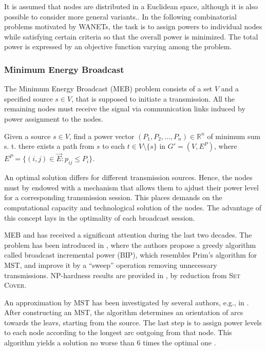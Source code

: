 It is assumed that nodes are distributed in a Euclidean space, although it is also possible to consider more general variants..
In the following combinatorial problems motivated by WANETs, the task is to assign powers to individual nodes while satisfying certain criteria so that the overall power is minimized.
The total power is expressed by an objective function varying among the problem.

\subsubsection{Minimum Energy Broadcast}

The Minimum Energy Broadcast (MEB) problem consists of a set $V$ and a specified source $s\in V$, that is supposed to initiate a transmission.
All the remaining nodes must receive the signal via communication links induced by power assignment to the nodes.
\begin{problem}
Given a source $s\in V$, find a power vector $(P_1,P_2,\dots,P_n)\in\mathbb{R}^n$ of minimum sum s. t. 
there exists a path from $s$ to each $t\in V\setminus\{s\}$ in $G'=(V,E^P)$, where $E^P=\{(i,j)\in \vec{E}: p_{ij}\leq P_i\}$.
\end{problem}
An optimal solution differs for different transmission sources.
Hence, the nodes must by endowed with a mechanism that allows them to ajdust their power level for a corresponding transmission session.
This places demands on the computational capacity and technological solution of the nodes.
The advantage of this concept lays in the optimality of each broadcast session.

MEB  and has received a significant attention during the last two decades.
The problem has been introduced in \cite{wieselthier00}, where the authors propose a greedy algorithm called broadcast incremental power (BIP), which resembles Prim's algorithm for MST,
and improve it by a ``sweep'' operation removing unnecessary transmissions.
NP-hardness results are provided in \cite{cagalj02}, by reduction from \textsc{Set Cover}.

An approximation by MST has been investigated by several authors, e.g., in \cite{clementi01}.
After constructing an MST, the algorithm determines an orientation of arcs towards the leavs, starting from the source.
The last step is to assign power levels to each node according to the longest arc outgoing from that node.
This algorithm yields a solution no worse than 6 times the optimal one \cite{ambuhl05}.


